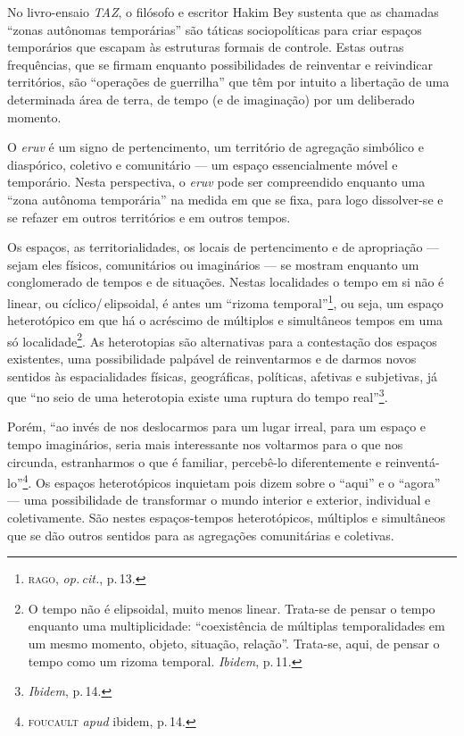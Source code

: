 No livro-ensaio \emph{TAZ}, o filósofo e escritor Hakim Bey sustenta que
as chamadas ``zonas autônomas temporárias'' são táticas
sociopolíticas para criar espaços temporários que escapam às estruturas
formais de controle. Estas outras frequências, que se firmam enquanto
possibilidades de reinventar e reivindicar territórios, são
``operações de guerrilha'' que têm por intuito a libertação de
uma determinada área de terra, de tempo (e de imaginação) por um
deliberado momento.

O \emph{eruv} é um signo de pertencimento, um território de agregação
simbólico e diaspórico, coletivo e comunitário --- um espaço
essencialmente móvel e temporário. Nesta perspectiva, o \emph{eruv} pode
ser compreendido enquanto uma ``zona autônoma temporária'' na
medida em que se fixa, para logo dissolver-se e se refazer em outros
territórios e em outros tempos.

Os espaços, as territorialidades, os locais de pertencimento e de
apropriação --- sejam eles físicos, comunitários ou imaginários --- se
mostram enquanto um conglomerado de tempos e de situações. Nestas
localidades o tempo em si não é linear, ou cíclico/\,elipsoidal, é antes
um ``rizoma temporal''\footnote{\textsc{rago}, \emph{op.\,cit.}, p.\,13.}, ou seja,
um espaço heterotópico em que há o acréscimo de múltiplos e simultâneos
tempos em uma só localidade\footnote{O tempo não é elipsoidal, muito
  menos linear. Trata-se de pensar o tempo enquanto uma multiplicidade:
``coexistência de múltiplas temporalidades em um mesmo momento,
  objeto, situação, relação''. Trata-se, aqui, de pensar o tempo como
  um rizoma temporal. \emph{Ibidem}, p.\,11.}. As heterotopias são alternativas para a
contestação dos espaços existentes, uma possibilidade palpável de
reinventarmos e de darmos novos sentidos às espacialidades físicas,
geográficas, políticas, afetivas e subjetivas, já que ``no seio de
uma heterotopia existe uma ruptura do tempo real''\footnote{\emph{Ibidem}, p.\,14.}.

Porém, ``ao invés de nos deslocarmos para um lugar irreal, para um
espaço e tempo imaginários, seria mais interessante nos voltarmos para o
que nos circunda, estranharmos o que é familiar, percebê-lo
diferentemente e reinventá-lo''\footnote{\textsc{foucault} \emph{apud} ibidem, p.\,14.}.
Os espaços heterotópicos inquietam pois dizem sobre o ``aqui'' e
o ``agora'' --- uma possibilidade de transformar o mundo interior
e exterior, individual e coletivamente. São nestes espaços-tempos
heterotópicos, múltiplos e simultâneos que se dão outros sentidos para
as agregações comunitárias e coletivas.

